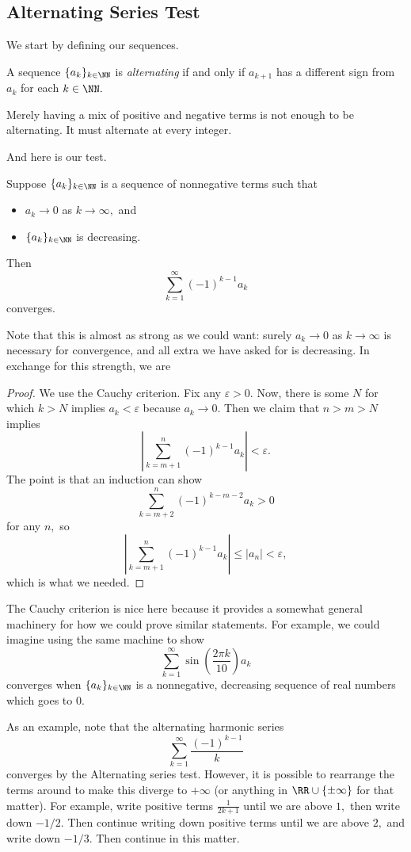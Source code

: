 \documentclass[../notes.tex]{subfiles}
\begin{document}
\subsection{Alternating Series Test}
We start by defining our sequences.
\begin{definition}[Alternating]
	A sequence $\{a_k\}_{k\in\NN}$ is \textit{alternating} if and only if $a_{k+1}$ has a different sign from $a_k$ for each $k\in\NN.$
\end{definition}
\begin{warn}
	Merely having a mix of positive and negative terms is not enough to be alternating. It must alternate at every integer.
\end{warn}
And here is our test.
\begin{prop}
	Suppose $\{a_k\}_{k\in\NN}$ is a sequence of nonnegative terms such that
	\begin{itemize}
		\item $a_k\to0$ as $k\to\infty,$ and
		\item $\{a_k\}_{k\in\NN}$ is decreasing.
	\end{itemize}
	Then
	\[\sum_{k=1}^\infty(-1)^{k-1}a_k\]
	converges.
\end{prop}
Note that this is almost as strong as we could want: surely $a_k\to0$ as $k\to\infty$ is necessary for convergence, and all extra we have asked for is decreasing. In exchange for this strength, we are 
\begin{proof}
	We use the Cauchy criterion. Fix any $\varepsilon>0.$ Now, there is some $N$ for which $k>N$ implies $a_k<\varepsilon$ because $a_k\to0.$ Then we claim that $n>m>N$ implies
	\[\left|\sum_{k=m+1}^n(-1)^{k-1}a_k\right|<\varepsilon.\]
	The point is that an induction can show
	\[\sum_{k=m+2}^n(-1)^{k-m-2}a_k>0\]
	for any $n,$ so
	\[\left|\sum_{k=m+1}^n(-1)^{k-1}a_k\right|\le|a_n|<\varepsilon,\]
	which is what we needed.
\end{proof}
\begin{remark}
	The Cauchy criterion is nice here because it provides a somewhat general machinery for how we could prove similar statements. For example, we could imagine using the same machine to show
	\[\sum_{k=1}^\infty\sin\left(\frac{2\pi k}{10}\right)a_k\]
	converges when $\{a_k\}_{k\in\NN}$ is a nonnegative, decreasing sequence of real numbers which goes to $0.$
\end{remark}
As an example, note that the alternating harmonic series
\[\sum_{k=1}^\infty\frac{(-1)^{k-1}}k\]
converges by the Alternating series test. However, it is possible to rearrange the terms around to make this diverge to $+\infty$ (or anything in $\RR\cup\{\pm\infty\}$ for that matter). For example, write positive terms $\frac1{2k+1}$ until we are above $1,$ then write down $-1/2.$ Then continue writing down positive terms until we are above $2,$ and write down $-1/3.$ Then continue in this matter.
\end{document}
